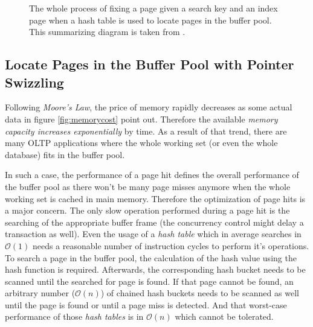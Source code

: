 \begin{@empty}
\begin{figure}[ht!]
{
		}
        \vspace{.5em}
		\caption{The whole process of fixing a page given a search key and an index page when a hash table is used to locate pages in the buffer pool. This summarizing diagram is taken from \cite{Graefe:2014}.}
		\label{fig:locatehash}
	\end{figure}
\end{@empty}

\subsection[With Pointer Swizzling]{Locate Pages in the Buffer Pool with Pointer Swizzling} \label{subsec:conceptbufferswizzling}

	Following \emph{Moore's Law}, the price of memory rapidly decreases as some actual data in figure \ref{fig:memorycost} point out. Therefore the available \emph{memory capacity increases exponentially} by time. As a result of that trend, there are many OLTP applications where the whole working set (or even the whole database) fits in the buffer pool.
	
	In such a case, the performance of a page hit defines the overall performance of the buffer pool as there won't be many page misses anymore when the whole working set is cached in main memory. Therefore the optimization of page hits is a major concern. The only slow operation performed during a page hit is the searching of the appropriate buffer frame (the concurrency control might delay a transaction as well). Even the usage of a \emph{hash table} which in average searches in $\mathcal{O}\left(1\right)$ needs a reasonable number of instruction cycles to perform it's operations. To search a page in the buffer pool, the calculation of the hash value using the hash function is required. Afterwards, the corresponding hash bucket needs to be scanned until the searched for page is found. If that page cannot be found, an arbitrary number ($\mathcal{O}\left(n\right)$) of chained hash buckets needs to be scanned as well until the page is found or until a page miss is detected. And that worst-case performance of those \emph{hash tables} is in $\mathcal{O}\left(n\right)$ which cannot be tolerated.

